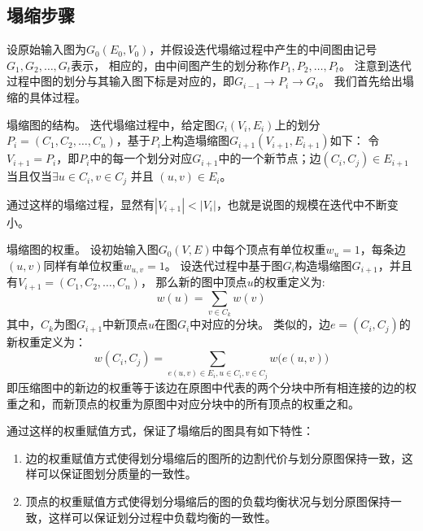 \documentclass[master]{njuthesis}
\begin{document}
\subsection{塌缩步骤}
设原始输入图为$G_{0}(E_0,V_0)$，并假设迭代塌缩过程中产生的中间图由记号$G_1, G_2, \dots, G_t$表示，
相应的，由中间图产生的划分称作$P_1, P_2, \dots, P_{t}$。
注意到迭代过程中图的划分与其输入图下标是对应的，即$G_{i-1} \rightarrow P_i \rightarrow G_i$。
我们首先给出塌缩的具体过程。
\begin{definition}
塌缩图的结构。 迭代塌缩过程中，给定图$G_i(V_i, E_i)$上的划分$P_i=(C_1, C_2, \dots, C_n)$，基于$P_i$上构造塌缩图$G_{i+1}(V_{i+1}, E_{i+1})$如下：
 令$V_{i+1} = P_i$，即$P_i$中的每一个划分对应$G_{i+1}$中的一个新节点；边$(C_i, C_j) \in E_{i+1}$当且仅当$\exists
 u \in C_i, v \in C_j$ 并且 $(u, v) \in E_i$。
\end{definition}
通过这样的塌缩过程，显然有$|V_{i+1}| < |V_i|$，也就是说图的规模在迭代中不断变小。
\begin{definition}
塌缩图的权重。 设初始输入图$G_{0}(V,E)$中每个顶点有单位权重$w_u=1$，每条边$(u,v)$同样有单位权重$w_{u,v}=1$。
设迭代过程中基于图$G_i$构造塌缩图$G_{i+1}$，并且有$V_{i+1}=(C_1, C_2, \dots, C_n)$，
那么新的图中顶点$u$的权重定义为:
\begin{equation}
\label{eq:vertex_weight}
w(u) = \sum\limits_{v \in C_k} w(v)
\end{equation}
其中，$C_k$为图$G_{i+1}$中新顶点$u$在图$G_i$中对应的分块。
类似的，边$e=(C_i, C_j)$的新权重定义为：
 \begin{equation}
w(C_i, C_j) = \sum\limits_{e(u,v) \in E_i, u \in C_i, v \in C_j} w\big(e(u,v)\big)
\end{equation}
即压缩图中的新边的权重等于该边在原图中代表的两个分块中所有相连接的边的权重之和，而新顶点的权重为原图中对应分块中的所有顶点的权重之和。
\end{definition}
通过这样的权重赋值方式，保证了塌缩后的图具有如下特性：
\begin{enumerate}
 \item 边的权重赋值方式使得划分塌缩后的图所的边割代价与划分原图保持一致，这样可以保证图划分质量的一致性。
 \item 顶点的权重赋值方式使得划分塌缩后的图的负载均衡状况与划分原图保持一致，这样可以保证划分过程中负载均衡的一致性。
\end{enumerate}
\end{document}
